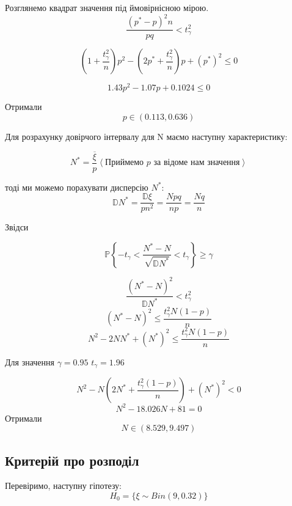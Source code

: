 \documentclass{article}
\begin{document}
Розглянемо квадрат значення під ймовірнісною мірою.
$$
\frac{ ( p^* - p)^2  n } {pq} < t_\gamma^2
$$

$$
\left(1 + \frac{t_\gamma^2}{n} \right) p^2 - \left( 2 p^* + \frac{t_\gamma^2}{n}\right) p + (p^*)^2
\leq 0
$$

$$
1.43p^2 - 1.07p + 0.1024 \leq 0
$$

Отримали
$$
p \in \left(0.113, 0.636  \right)
$$

Для розрахунку довірчого інтервалу для N маємо наступну характеристику:

$$
N^* = \frac{\overline\xi}{p} \left< \textrm{Приймемо } p \textrm{ за відоме нам значення} \right>
$$

тоді ми можемо порахувати дисперсію $N^*$:
$$
\mathbb{D}N^* = \frac{ \mathbb{D}\xi}{pn^2} = \frac{ Npq}{np} = \frac{Nq}{n}
$$

Звідси 

$$
\mathbb{P} \left\{ -t_\gamma < \frac{N^* - N}{\sqrt{\mathbb{D}N^*}} < t_\gamma \right\} \geq \gamma 
$$

$$
\frac{(N^* - N)^2}{\mathbb{D}N^*} < t_\gamma^2  
$$
$$
(N^* - N)^2 \leq \frac{t_\gamma^2 N(1-p)}{n}
$$
$$
N^2 - 2N N^* + (N^*)^2 \leq \frac{t_\gamma^2 N(1-p)}{n}
$$

Для значення $\gamma=0.95$ $t_\gamma = 1.96$  

$$
N^2 - N \left( 2N^* + \frac{t_\gamma^2(1-p)}{n} \right) + (N^*)^2 < 0
$$
$$
N^2 - 18.026N + 81 = 0
$$
Отримали
\[
    N \in \left( 8.529, 9.497\right) 
\]

\subsection{Критерій про розподіл}
Перевіримо, наступну гіпотезу:
$$
H_0= \{\xi \sim Bin(9, 0.32)\}
$$
\end{document}
